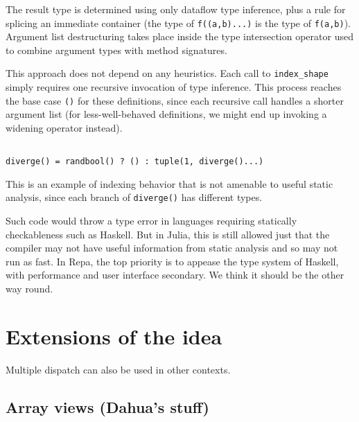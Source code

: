 \documentclass[preprint]{sigplanconf}
\newcommand{\code}[1]{\texttt{#1}}
\begin{document}

The result type is determined using only dataflow type inference, plus a rule
for splicing an immediate container (the type of \texttt{f((a,b)...)} is the
type of \texttt{f(a,b)}). Argument list destructuring takes place inside the
type intersection operator used to combine argument types with method
signatures.

This approach does not depend on any heuristics. Each call to
\texttt{index\_shape} simply requires one recursive invocation of type
inference. This process reaches the base case \texttt{()} for these
definitions, since each recursive call handles a shorter argument list (for
less-well-behaved definitions, we might end up invoking a widening operator
instead).

\begin{verbatim}

diverge() = randbool() ? () : tuple(1, diverge()...)

\end{verbatim}

This is an example of indexing behavior that is not amenable to useful static
analysis, since each branch of \code{diverge()} has different types.


Such code would throw a type error in languages requiring statically
checkableness such as Haskell. But in Julia, this is still allowed just that
the compiler may not have useful information from static analysis and so may
not run as fast. In Repa, the top priority is to appease the type system of
Haskell, with performance and user interface secondary. We think it should be
the other way round.

\section{Extensions of the idea}

Multiple dispatch can also be used in other contexts.

\subsection{Array views (Dahua's stuff)}
\end{document}

